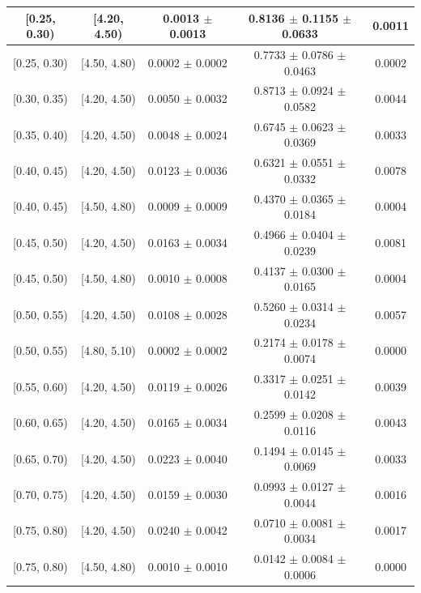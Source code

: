 \begin{longtable}{|c|c|c|c|c|}
\hline
\endlastfoot
[0.25, 0.30) & [4.20, 4.50) & 0.0013 $\pm$ 0.0013 & 0.8136 $\pm$ 0.1155 $\pm$ 0.0633 & 0.0011 \\ 
\hline
[0.25, 0.30) & [4.50, 4.80) & 0.0002 $\pm$ 0.0002 & 0.7733 $\pm$ 0.0786 $\pm$ 0.0463 & 0.0002 \\ 
\hline
[0.30, 0.35) & [4.20, 4.50) & 0.0050 $\pm$ 0.0032 & 0.8713 $\pm$ 0.0924 $\pm$ 0.0582 & 0.0044 \\ 
\hline
[0.35, 0.40) & [4.20, 4.50) & 0.0048 $\pm$ 0.0024 & 0.6745 $\pm$ 0.0623 $\pm$ 0.0369 & 0.0033 \\ 
\hline
[0.40, 0.45) & [4.20, 4.50) & 0.0123 $\pm$ 0.0036 & 0.6321 $\pm$ 0.0551 $\pm$ 0.0332 & 0.0078 \\ 
\hline
[0.40, 0.45) & [4.50, 4.80) & 0.0009 $\pm$ 0.0009 & 0.4370 $\pm$ 0.0365 $\pm$ 0.0184 & 0.0004 \\ 
\hline
[0.45, 0.50) & [4.20, 4.50) & 0.0163 $\pm$ 0.0034 & 0.4966 $\pm$ 0.0404 $\pm$ 0.0239 & 0.0081 \\ 
\hline
[0.45, 0.50) & [4.50, 4.80) & 0.0010 $\pm$ 0.0008 & 0.4137 $\pm$ 0.0300 $\pm$ 0.0165 & 0.0004 \\ 
\hline
[0.50, 0.55) & [4.20, 4.50) & 0.0108 $\pm$ 0.0028 & 0.5260 $\pm$ 0.0314 $\pm$ 0.0234 & 0.0057 \\ 
\hline
[0.50, 0.55) & [4.80, 5.10) & 0.0002 $\pm$ 0.0002 & 0.2174 $\pm$ 0.0178 $\pm$ 0.0074 & 0.0000 \\ 
\hline
[0.55, 0.60) & [4.20, 4.50) & 0.0119 $\pm$ 0.0026 & 0.3317 $\pm$ 0.0251 $\pm$ 0.0142 & 0.0039 \\ 
\hline
[0.60, 0.65) & [4.20, 4.50) & 0.0165 $\pm$ 0.0034 & 0.2599 $\pm$ 0.0208 $\pm$ 0.0116 & 0.0043 \\ 
\hline
[0.65, 0.70) & [4.20, 4.50) & 0.0223 $\pm$ 0.0040 & 0.1494 $\pm$ 0.0145 $\pm$ 0.0069 & 0.0033 \\ 
\hline
[0.70, 0.75) & [4.20, 4.50) & 0.0159 $\pm$ 0.0030 & 0.0993 $\pm$ 0.0127 $\pm$ 0.0044 & 0.0016 \\ 
\hline
[0.75, 0.80) & [4.20, 4.50) & 0.0240 $\pm$ 0.0042 & 0.0710 $\pm$ 0.0081 $\pm$ 0.0034 & 0.0017 \\ 
\hline
[0.75, 0.80) & [4.50, 4.80) & 0.0010 $\pm$ 0.0010 & 0.0142 $\pm$ 0.0084 $\pm$ 0.0006 & 0.0000 \\ 
\hline
\end{longtable}
